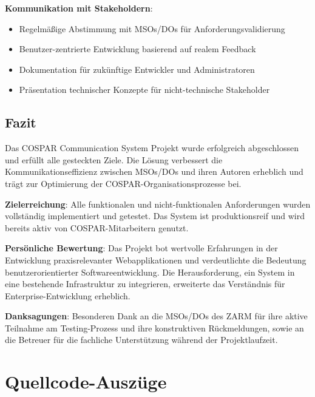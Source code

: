 \documentclass[11pt,a4paper]{article}
\begin{document}
\textbf{Kommunikation mit Stakeholdern}:
\begin{itemize}
    \item Regelmäßige Abstimmung mit MSOs/DOs für Anforderungsvalidierung
    \item Benutzer-zentrierte Entwicklung basierend auf realem Feedback
    \item Dokumentation für zukünftige Entwickler und Administratoren
    \item Präsentation technischer Konzepte für nicht-technische Stakeholder
\end{itemize}

\subsection{Fazit}
Das COSPAR Communication System Projekt wurde erfolgreich abgeschlossen und erfüllt alle gesteckten Ziele. Die Lösung verbessert die Kommunikationseffizienz zwischen MSOs/DOs und ihren Autoren erheblich und trägt zur Optimierung der COSPAR-Organisationsprozesse bei.

\textbf{Zielerreichung}: Alle funktionalen und nicht-funktionalen Anforderungen wurden vollständig implementiert und getestet. Das System ist produktionsreif und wird bereits aktiv von COSPAR-Mitarbeitern genutzt.

\textbf{Persönliche Bewertung}: Das Projekt bot wertvolle Erfahrungen in der Entwicklung praxisrelevanter Webapplikationen und verdeutlichte die Bedeutung benutzerorientierter Softwareentwicklung. Die Herausforderung, ein System in eine bestehende Infrastruktur zu integrieren, erweiterte das Verständnis für Enterprise-Entwicklung erheblich.

\textbf{Danksagungen}: Besonderen Dank an die MSOs/DOs des ZARM für ihre aktive Teilnahme am Testing-Prozess und ihre konstruktiven Rückmeldungen, sowie an die Betreuer für die fachliche Unterstützung während der Projektlaufzeit.

\appendix

\section{Quellcode-Auszüge}
\end{document}
